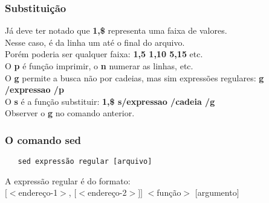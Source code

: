 \documentclass{beamer}
\begin{document}
   \begin{frame}
      \frametitle{Substituição}
      Já deve ter notado que \textbf{1,\$} representa uma faixa de valores. \\
      Nesse caso, é da linha um até o final do arquivo. \\
      Porém poderia ser qualquer faixa: \textbf{1,5 1,10 5,15} etc. \\
      O \textbf{p} é função imprimir, o \textbf{n} numerar as linhas, etc. \\
      O \textbf{g} permite a busca não por cadeias, mas sim expressões regulares: \textbf{g \slash expressao \slash p} \\
      O \textbf{s} é a função substituir: \textbf{1,\$ s\slash expressao \slash cadeia \slash g} \\
      Observer o \textbf{g} no comando anterior. 
   \end{frame}


\begin{frame}[fragile]
   \frametitle{O comando sed}
   \begin{verbatim}
   sed expressão regular [arquivo]
   \end{verbatim}
   A expressão regular é do formato: \\
   $[<$endereço-1$>$, $[<$endereço-2$>]]$ $<$função$>$ $[$argumento$]$
\end{frame}
\end{document}
